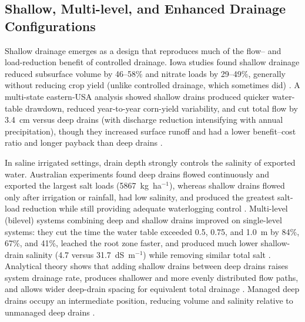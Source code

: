 \subsection{Shallow, Multi-level, and Enhanced Drainage Configurations}

Shallow drainage emerges as a design that reproduces much of the flow-- and
load-reduction benefit of controlled drainage. Iowa studies found shallow
drainage reduced subsurface volume by 46--58\% and nitrate loads by 29--49\%,
generally without reducing crop yield (unlike controlled drainage, which
sometimes did) \parencite{Helmers2012,Schott2017}. A multi-state eastern-USA
analysis showed shallow drains produced quicker water-table drawdown, reduced
year-to-year corn-yield variability, and cut total flow by 3.4~cm versus deep
drains (with discharge reduction intensifying with annual precipitation), though
they increased surface runoff and had a lower benefit--cost ratio and longer
payback than deep drains \parencite{Ghane2021b}.

In saline irrigated settings, drain depth strongly controls the salinity of
exported water. Australian experiments found deep drains flowed continuously and
exported the largest salt loads (5867~kg~ha$^{-1}$), whereas shallow drains
flowed only after irrigation or rainfall, had low salinity, and produced the
greatest salt-load reduction while still providing adequate waterlogging control
\parencite{Christen2001b}. Multi-level (bilevel) systems combining deep and
shallow drains improved on single-level systems: they cut the time the water
table exceeded 0.5, 0.75, and 1.0~m by 84\%, 67\%, and 41\%, leached the root
zone faster, and produced much lower shallow-drain salinity (4.7 versus
31.7~dS~m$^{-1}$) while removing similar total salt
\parencite{Hornbuckle2007}. Analytical theory shows that adding shallow drains
between deep drains raises system drainage rate, produces shallower and more
evenly distributed flow paths, and allows wider deep-drain spacing for equivalent
total drainage \parencite{Hornbuckle2012}. Managed deep drains occupy an
intermediate position, reducing volume and salinity relative to unmanaged deep
drains \parencite{Ayars2006b,Christen2001b}.

